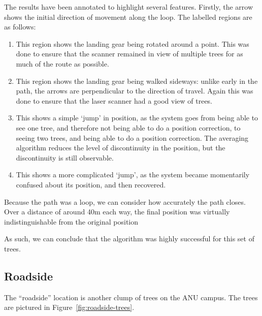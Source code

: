 \documentclass[12pt,oneside,a4paper]{book}
\begin{document}
The results have been annotated to highlight several
features. Firstly, the arrow shows the initial direction of movement
along the loop. The labelled regions are as follows:
\begin{enumerate}[A:]
\item This region shows the landing gear being rotated around a
  point. This was done to ensure that the scanner remained in view of
  multiple trees for as much of the route as possible.
\item This region shows the landing gear being walked sideways: unlike
  early in the path, the arrows are perpendicular to the direction of
  travel. Again this was done to ensure that the laser scanner had a
  good view of trees.
\item This shows a simple `jump' in position, as the system goes from
  being able to see one tree, and therefore not being able to do a
  position correction, to seeing two trees, and being able to do a
  position correction. The averaging algorithm reduces the level of
  discontinuity in the position, but the discontinuity is still
  observable.
\item This shows a more complicated `jump', as the system became
  momentarily confused about its position, and then recovered.
\end{enumerate}

Because the path was a loop, we can consider how accurately the path
closes. Over a distance of around 40m each way, the final position was
virtually indistinguishable from the original position

As such, we can conclude that the algorithm was highly successful for
this set of trees.

\subsection{Roadside}
\label{sec:roadside}

The ``roadside'' location is another clump of trees on the ANU
campus. The trees are pictured in Figure~\ref{fig:roadside-trees}.
\end{document}
